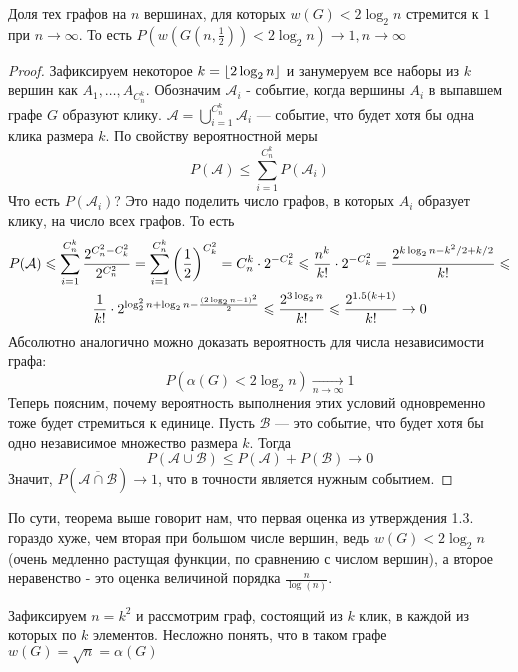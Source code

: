 \begin{theorem}
Доля тех графов на $n$ вершинах, для которых $w(G) < 2\log_2{n}$ стремится к $1$ при $n \to \infty$. То есть $P(w(G(n, \frac{1}{2})) < 2\log_2{n}) \to 1, n \to \infty$
\end{theorem}
\begin{proof}
Зафиксируем некоторое $k = \left\lfloor 2\log_2 n \right\rfloor$ и занумеруем все наборы из $k$ вершин как $A_1, \ldots, A_{C_n^k}$. Обозначим $\mathcal{A}_i$ - событие, когда вершины $A_i$ в выпавшем графе $G$ образуют клику. $\mathcal{A} = \bigcup_{i = 1}^{C_n^k} \mathcal{A}_i$  --- событие, что будет хотя бы одна клика размера $k$. По свойству вероятностной меры
	\[
		P(\mathcal{A}) \le \sum_{i = 1}^{C_n^k} P(\mathcal{A}_i)
	\]
	Что есть $P(\mathcal{A}_i)$? Это надо поделить число графов, в которых $A_i$ образует клику, на число всех графов. То есть
	\begin{multline*}
		P(\mathcal{A}) \leqslant \sum_{i = 1}^{C_n^k} \frac{2^{C_n^2 - C_k^2}}{2^{C_n^2}} = \sum_{i = 1}^{C_n^k} \left(\frac{1}{2}\right)^{C_k^2} = C_n^k \cdot 2^{-C_k^2} \leqslant \frac{n^k}{k!} \cdot 2^{-C_k^2} = \frac{2^{k \log_2 n - k^2 / 2 + k / 2}}{k!} \leqslant
		\\
		\frac{1}{k!} \cdot 2^{\log^2_2 n + \log_2 n - \frac{(2\log_2 n - 1)^2}{2}} \leqslant \frac{2^{3\log_2 n}}{k!} \leqslant \frac{2^{1.5(k + 1)}}{k!} \to 0
	\end{multline*}
	Абсолютно аналогично можно доказать вероятность для числа независимости графа:
	\[
		P(\alpha(G) < 2\log_2 n) \xrightarrow[n \to \infty]{} 1
	\]
	Теперь поясним, почему вероятность выполнения этих условий одновременно тоже будет стремиться к единице. Пусть $\mathcal{B}$ --- это событие, что будет хотя бы одно независимое множество размера $k$. Тогда
	\[
		P(\mathcal{A} \cup \mathcal{B}) \le P(\mathcal{A}) + P(\mathcal{B}) \to 0
	\]
	Значит, $P(\overline{\mathcal{A} \cap \mathcal{B}}) \to 1$, что в точности является нужным событием.
\end{proof}

\begin{note}
    По сути, теорема выше говорит нам, что первая оценка из утверждения 1.3. гораздо хуже, чем вторая при большом числе вершин, ведь $w(G) < 2\log_2{n}$(очень медленно растущая функции, по сравнению с числом вершин), а второе неравенство - это оценка величиной порядка $\frac{n}{\log(n)}$.
\end{note}

\begin{example}
	Зафиксируем $n = k^2$ и рассмотрим граф, состоящий из $k$ клик, в каждой из которых по $k$ элементов. Несложно понять, что в таком графе $w(G) = \sqrt{n} = \alpha(G)$
\end{example}

